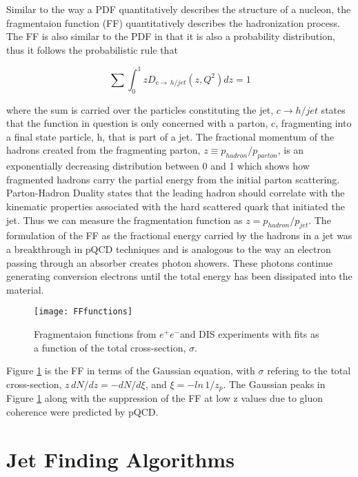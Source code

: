 Similar to the way a PDF quantitatively describes the structure of a nucleon, the fragmentaion function (FF) quantitatively describes the hadronization process.  The FF is also similar to the PDF in that it is also a probability distribution, thus it follows the probabilistic rule that

\begin{equation}
\sum \int_{0}^{1} z D_{c \rightarrow \, h/jet} (z,Q^{2})dz = 1
\label{eq:FFRule}
\end{equation}

\noindent
where the sum is carried over the particles constituting the jet, $c \rightarrow h/jet$ states that the function in question is only concerned with a parton, c, fragmenting into a final state particle, h, that is part of a jet.  The fractional momentum of the hadrons created from the fragmenting parton, $z \equiv p_{hadron} / p_{parton}$, is an exponentially decreasing distribution between 0 and 1 which shows how fragmented hadrons carry the partial energy from the initial parton scattering.  Parton-Hadron Duality\cite{Jenkovszky:2012dc} states that the leading hadron should correlate with the kinematic properties associated with the hard scattered quark that initiated the jet.  Thus we can measure the fragmentation function as $z = p_{hadron} / p_{jet}$.  The formulation of the FF as the fractional energy carried by the hadrons in a jet was a breakthrough in pQCD techniques and is analogous to the way an electron passing through an absorber creates photon showers. These photons continue generating conversion electrons until the total energy has been dissipated into the material.

\begin{figure}[h]
\texttt{[image: FFfunctions]}
\centering
\caption{Fragmentaion functions from $e^{+}e^{-}$and DIS experiments with fits\cite{rak_tannenbaum_2013} as a function of the total cross-section, $\sigma$.}
\label{fig:FFfunc}
\end{figure}


Figure \ref{fig:FFfunc} is the FF in terms of the Gaussian equation, with $\sigma$ refering to the total cross-section, $z \, dN/dz = - dN /d \xi $, and $\xi = -ln  \,1/z_{p}$. The Gaussian peaks in Figure \ref{fig:FFfunc} along with the suppression of the FF at low z values due to gluon coherence were predicted by pQCD. 

\section{Jet Finding Algorithms}


